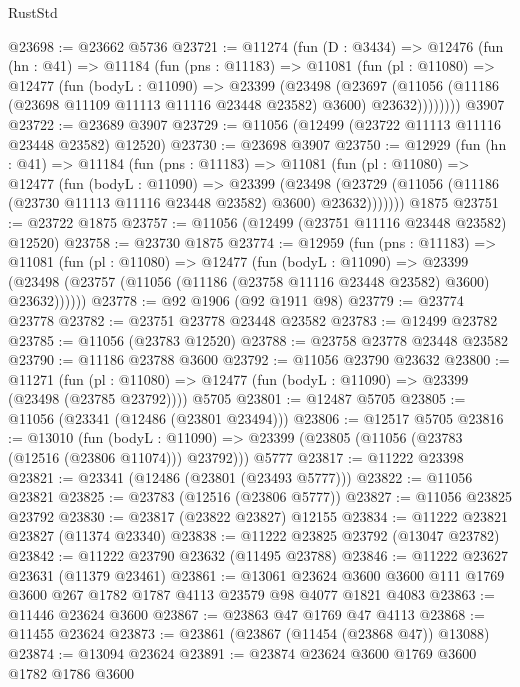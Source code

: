 \begin{lexlean}{RustStd}
\begin{coremodule}
@23698 := @23662 @5736
@23721 := @11274
    (fun (D : @3434) =>
    @12476
      (fun (hn : @41) =>
      @11184
        (fun (pns : @11183) =>
        @11081
          (fun (pl : @11080) =>
          @12477
            (fun (bodyL : @11090) =>
            @23399
              (@23498
                (@23697
                  (@11056 (@11186 (@23698 @11109 @11113 @11116 @23448 @23582) @3600) @23632))))))))
    @3907
@23722 := @23689 @3907
@23729 := @11056 (@12499 (@23722 @11113 @11116 @23448 @23582) @12520)
@23730 := @23698 @3907
@23750 := @12929
    (fun (hn : @41) =>
    @11184
      (fun (pns : @11183) =>
      @11081
        (fun (pl : @11080) =>
        @12477
          (fun (bodyL : @11090) =>
          @23399
            (@23498
              (@23729 (@11056 (@11186 (@23730 @11113 @11116 @23448 @23582) @3600) @23632)))))))
    @1875
@23751 := @23722 @1875
@23757 := @11056 (@12499 (@23751 @11116 @23448 @23582) @12520)
@23758 := @23730 @1875
@23774 := @12959
    (fun (pns : @11183) =>
    @11081
      (fun (pl : @11080) =>
      @12477
        (fun (bodyL : @11090) =>
        @23399 (@23498 (@23757 (@11056 (@11186 (@23758 @11116 @23448 @23582) @3600) @23632))))))
@23778 := @92 @1906 (@92 @1911 @98)
@23779 := @23774 @23778
@23782 := @23751 @23778 @23448 @23582
@23783 := @12499 @23782
@23785 := @11056 (@23783 @12520)
@23788 := @23758 @23778 @23448 @23582
@23790 := @11186 @23788 @3600
@23792 := @11056 @23790 @23632
@23800 := @11271
    (fun (pl : @11080) => @12477 (fun (bodyL : @11090) => @23399 (@23498 (@23785 @23792))))
    @5705
@23801 := @12487 @5705
@23805 := @11056 (@23341 (@12486 (@23801 @23494)))
@23806 := @12517 @5705
@23816 := @13010
    (fun (bodyL : @11090) => @23399 (@23805 (@11056 (@23783 (@12516 (@23806 @11074))) @23792)))
    @5777
@23817 := @11222 @23398
@23821 := @23341 (@12486 (@23801 (@23493 @5777)))
@23822 := @11056 @23821
@23825 := @23783 (@12516 (@23806 @5777))
@23827 := @11056 @23825 @23792
@23830 := @23817 (@23822 @23827) @12155
@23834 := @11222 @23821 @23827 (@11374 @23340)
@23838 := @11222 @23825 @23792 (@13047 @23782)
@23842 := @11222 @23790 @23632 (@11495 @23788)
@23846 := @11222 @23627 @23631 (@11379 @23461)
@23861 := @13061
    @23624
    @3600
    @3600
    @111
    @1769
    @3600
    @267
    @1782
    @1787
    @4113
    @23579
    @98
    @4077
    @1821
    @4083
@23863 := @11446 @23624 @3600
@23867 := @23863 @47 @1769 @47 @4113
@23868 := @11455 @23624
@23873 := @23861 (@23867 (@11454 (@23868 @47)) @13088)
@23874 := @13094 @23624
@23891 := @23874
    @23624
    @3600
    @1769
    @3600
    @1782
    @1786
    @3600

\end{coremodule}
\end{lexlean}
